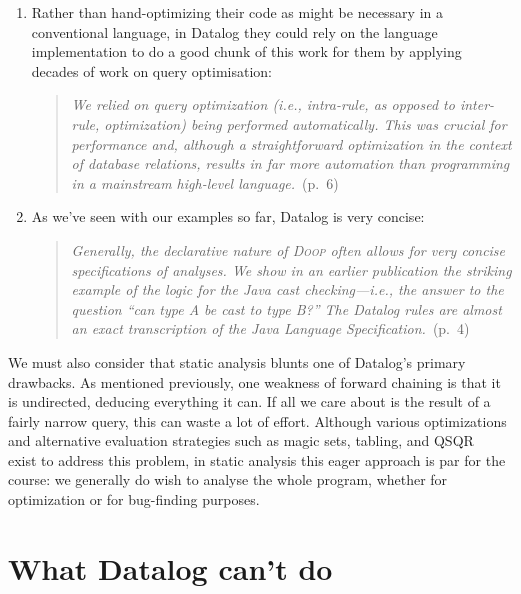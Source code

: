 \begin{enumerate}
\item Rather than hand-optimizing their code as might be necessary in a
  conventional language, in Datalog they could rely on the language
  implementation to do a good chunk of this work for them by applying decades of
  work on query optimisation:

  \begin{quote}
    \emph{We relied on query optimization (i.e., intra-rule, as opposed to
      inter-rule, optimization) being performed automatically. This was crucial
      for performance and, although a straightforward optimization in the
      context of database relations, results in far more automation than
      programming in a mainstream high-level language.}~(p.~6)
  \end{quote}
  
\item As we've seen with our examples so far, Datalog is very concise:
  
  \begin{quote}
    \emph{Generally, the declarative nature of \textsc{Doop} often allows for
      very concise specifications of analyses. We show in an earlier publication
      the striking example of the logic for the Java cast checking---i.e., the
      answer to the question ``can type A be cast to type B?'' The Datalog rules
      are almost an exact transcription of the Java Language
      Specification.}~(p.~4)
  \end{quote}
\end{enumerate}

\noindent
We must also consider that static analysis blunts one of Datalog's primary
drawbacks. As mentioned previously, one weakness of forward chaining is that it
is undirected, deducing everything it can. If all we care about is the result of
a fairly narrow query, this can waste a lot of effort. Although various
optimizations and alternative evaluation strategies such as magic sets, tabling,
and QSQR~ exist to address this problem, in static analysis this
eager approach is par for the course: we generally do wish to analyse the whole
program, whether for optimization or for bug-finding purposes. 



\section{What Datalog can't do}

